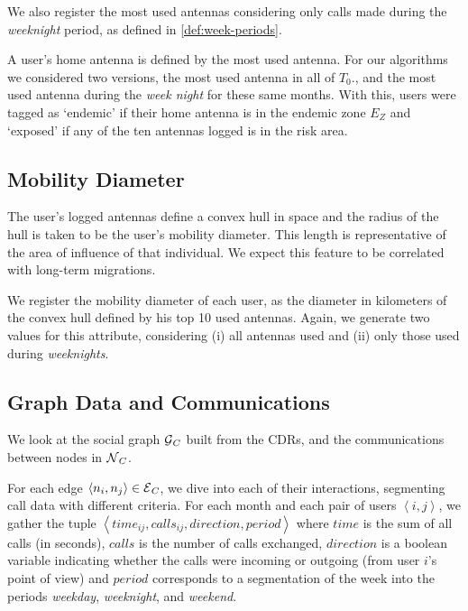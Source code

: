 We also register the most used antennas considering only calls made during the \textit{weeknight} period, as defined in \cref{def:week-periods}.

A user's home antenna is defined by the most used antenna.
For our algorithms we considered two versions, the most used antenna in all of $T_0$., and the most used antenna during the \textit{week night} for these same months.
With this, users were tagged as `endemic' if their home antenna is in the endemic zone $E_Z$ and `exposed' if any of the ten antennas logged is in the risk area.


\subsection{Mobility Diameter}\label{section:def_mobility_diameter}

The user's logged antennas define a convex hull in space and the radius of the hull is taken to be the user's mobility diameter.
This length is representative of the area of influence of that individual. 
We expect this feature to be correlated with long-term migrations.

We register the mobility diameter of each user, as the diameter in kilometers of the convex hull defined by his top 10 used antennas.
Again, we generate two values for this attribute, considering (i) all antennas used and (ii) only those used during \textit{weeknights}.



\subsection{Graph Data and Communications}\label{section:def_graph_data}

We look at the social graph $\operatorname{\mathcal{G}}_C$ built from the CDRs, and the communications between nodes in $\operatorname{\mathcal{N}}_C$.

For each edge $\left< n_i, n_j \right> \in \operatorname{\mathcal{E}}_C$, we dive into each of their interactions, segmenting call data with different criteria.
For each month and each pair of users $\left< i,j \right>$, we gather the tuple $\left< time_{ij}, calls_{ij}, direction, period \right>$ where $time$ is the sum of all calls (in seconds), $calls$ is the number of calls exchanged, $direction$ is a boolean variable indicating whether the calls were incoming or outgoing (from user $i$'s point of view) and $period$ corresponds to a segmentation of the week into the periods \textit{weekday}, \textit{weeknight}, and \textit{weekend}.


